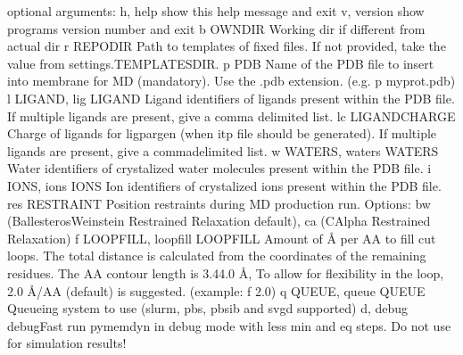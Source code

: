 \documentclass[letterpaper,10pt,english]{sphinxmanual}
\begin{document}
\begin{enumerate}
\begin{sphinxVerbatim}[commandchars=\\\{\}]
optional arguments:
  \PYGZhy{}h, \PYGZhy{}\PYGZhy{}help            show this help message and exit
  \PYGZhy{}v, \PYGZhy{}\PYGZhy{}version         show program\PYGZsq{}s version number and exit
  \PYGZhy{}b OWN\PYGZus{}DIR            Working dir if different from actual dir
  \PYGZhy{}r REPO\PYGZus{}DIR           Path to templates of fixed files. If not provided,
                        take the value from settings.TEMPLATES\PYGZus{}DIR.
  \PYGZhy{}p PDB                Name of the PDB file to insert into membrane for MD
                        (mandatory). Use the .pdb extension. (e.g. \PYGZhy{}p
                        myprot.pdb)
  \PYGZhy{}l LIGAND, \PYGZhy{}\PYGZhy{}lig LIGAND
                        Ligand identifiers of ligands present within the PDB
                        file. If multiple ligands are present, give a comma\PYGZhy{}
                        delimited list.
  \PYGZhy{}\PYGZhy{}lc LIGAND\PYGZus{}CHARGE    Charge of ligands for ligpargen (when itp file should
                        be generated). If multiple ligands are present, give a
                        comma\PYGZhy{}delimited list.
  \PYGZhy{}w WATERS, \PYGZhy{}\PYGZhy{}waters WATERS
                        Water identifiers of crystalized water molecules
                        present within the PDB file.
  \PYGZhy{}i IONS, \PYGZhy{}\PYGZhy{}ions IONS  Ion identifiers of crystalized ions present within the
                        PDB file.
  \PYGZhy{}\PYGZhy{}res RESTRAINT       Position restraints during MD production run. Options:
                        bw (Ballesteros\PYGZhy{}Weinstein Restrained Relaxation \PYGZhy{}
                        default), ca (C\PYGZhy{}Alpha Restrained Relaxation)
  \PYGZhy{}f LOOP\PYGZus{}FILL, \PYGZhy{}\PYGZhy{}loop\PYGZus{}fill LOOP\PYGZus{}FILL
                        Amount of Å per AA to fill cut loops. The total
                        distance is calculated from the coordinates of the
                        remaining residues. The AA contour length is 3.4\PYGZhy{}4.0
                        Å, To allow for flexibility in the loop, 2.0 Å/AA
                        (default) is suggested. (example: \PYGZhy{}f 2.0)
  \PYGZhy{}q QUEUE, \PYGZhy{}\PYGZhy{}queue QUEUE
                        Queueing system to use (slurm, pbs, pbs\PYGZus{}ib and svgd
                        supported)
  \PYGZhy{}d, \PYGZhy{}\PYGZhy{}debug
  \PYGZhy{}\PYGZhy{}debugFast           run pymemdyn in debug mode with less min and eq steps.
                        Do not use for simulation results!
\end{sphinxVerbatim}


\end{enumerate}
\end{document}
